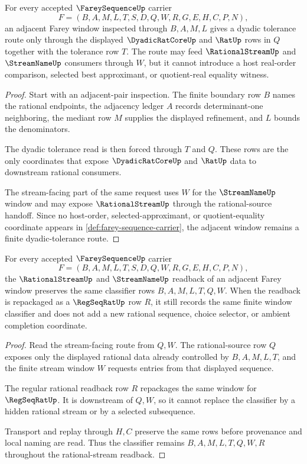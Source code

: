 \begin{theorem}
\label{thm:fareysequence-adjacent-dyadic-window}
For every accepted $\FareySequenceUp$ carrier
$$
F=(B,A,M,L,T,S,D,Q,W,R,G,E,H,C,P,N),
$$
an adjacent Farey window inspected through $B,A,M,L$ gives a dyadic tolerance route only through the displayed $\DyadicRatCoreUp$ and $\RatUp$ rows in $Q$ together with the tolerance row $T$. The route may feed $\RationalStreamUp$ and $\StreamNameUp$ consumers through $W$, but it cannot introduce a host real-order comparison, selected best approximant, or quotient-real equality witness.
\end{theorem}
\begin{proof}
Start with an adjacent-pair inspection. The finite boundary row $B$ names the rational endpoints, the adjacency ledger $A$ records determinant-one neighboring, the mediant row $M$ supplies the displayed refinement, and $L$ bounds the denominators.

The dyadic tolerance read is then forced through $T$ and $Q$. These rows are the only coordinates that expose $\DyadicRatCoreUp$ and $\RatUp$ data to downstream rational consumers.

The stream-facing part of the same request uses $W$ for the $\StreamNameUp$ window and may expose $\RationalStreamUp$ through the rational-source handoff. Since no host-order, selected-approximant, or quotient-equality coordinate appears in \autoref{def:farey-sequence-carrier}, the adjacent window remains a finite dyadic-tolerance route.
\end{proof}

\begin{theorem}
\label{thm:fareysequence-rational-stream-readback}
For every accepted $\FareySequenceUp$ carrier
$$
F=(B,A,M,L,T,S,D,Q,W,R,G,E,H,C,P,N),
$$
the $\RationalStreamUp$ and $\StreamNameUp$ readback of an adjacent Farey window preserves the same classifier rows $B,A,M,L,T,Q,W$. When the readback is repackaged as a $\RegSeqRatUp$ row $R$, it still records the same finite window classifier and does not add a new rational sequence, choice selector, or ambient completion coordinate.
\end{theorem}
\begin{proof}
Read the stream-facing route from $Q,W$. The rational-source row $Q$ exposes only the displayed rational data already controlled by $B,A,M,L,T$, and the finite stream window $W$ requests entries from that displayed sequence.

The regular rational readback row $R$ repackages the same window for $\RegSeqRatUp$. It is downstream of $Q,W$, so it cannot replace the classifier by a hidden rational stream or by a selected subsequence.

Transport and replay through $H,C$ preserve the same rows before provenance and local naming are read. Thus the classifier remains $B,A,M,L,T,Q,W,R$ throughout the rational-stream readback.
\end{proof}

